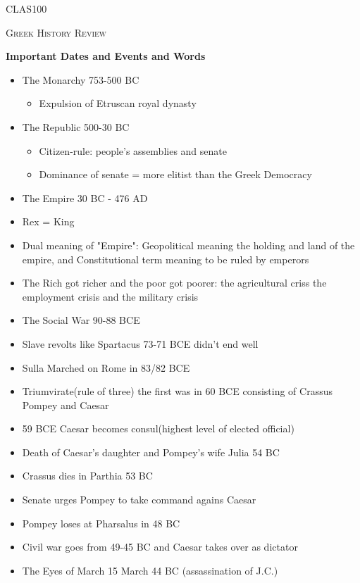 \documentclass[12pt,a4paper]{report}
\begin{document}
	\centering
	{\scshape\LARGE CLAS100 \par}
	{\scshape\Large Greek History Review \par}
	\vspace{1.5cm}

\textbf{Important Dates and Events and Words}
\begin{itemize}
\item The Monarchy 753-500 BC
\begin{itemize}
\item Expulsion of Etruscan royal dynasty
\end{itemize}
\item The Republic 500-30 BC
\begin{itemize}
\item Citizen-rule: people's assemblies and senate
\item Dominance of senate = more elitist than the Greek Democracy
\end{itemize}
\item The Empire 30 BC - 476 AD
\item Rex = King
\item Dual meaning of "Empire": Geopolitical meaning the holding and land of the empire, and Constitutional term meaning to be ruled by emperors
\item The Rich got richer and the poor got poorer: the agricultural criss the employment crisis and the military crisis
\item The Social War 90-88 BCE
\item Slave revolts like Spartacus 73-71 BCE didn't end well
\item Sulla Marched on Rome in 83/82 BCE
\item Triumvirate(rule of three) the first was in 60 BCE consisting of Crassus Pompey and Caesar
\item 59 BCE Caesar becomes consul(highest level of elected official)
\item Death of Caesar's daughter and Pompey's wife Julia 54 BC
\item Crassus dies in Parthia 53 BC
\item Senate urges Pompey to take command agains Caesar
\item Pompey loses at Pharsalus in 48 BC
\item Civil war goes from 49-45 BC and Caesar takes over as dictator
\item The Eyes of March 15 March 44 BC (assassination of J.C.)

\end{itemize}
\end{document}
